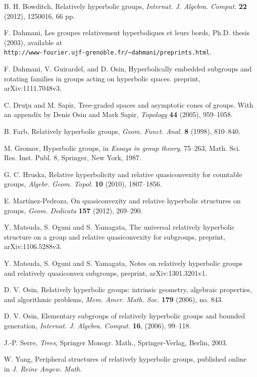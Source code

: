 \documentclass{amsart}
\theoremstyle{definition}
\begin{document}
\begin{thebibliography}{100}

B. H. Bowditch, 
Relatively hyperbolic groups, 
{\it Internat. J. Algebra. Comput.} {\bf 22} (2012), 1250016, 66 pp. 

F. Dahmani, Les groupes relativement hyperboliques et leurs bords, Ph.D. thesis (2003), available at \\
{\tt http://www-fourier.ujf-grenoble.fr/\verb+~+dahmani/preprints.html}. 

F. Dahmani, V. Guirardel, and D. Osin, 
Hyperbolically embedded subgroups and rotating families in groups acting on hyperbolic spaces. 
preprint, arXiv:1111.7048v3. 

C. Dru\c{t}u and M. Sapir, Tree-graded spaces and asymptotic cones of groups. With an appendix by Denis Osin and Mark Sapir, {\it Topology} {\bf 44} (2005), 959--1058.

B. Farb, 
Relatively hyperbolic groups,
{\it Geom. Funct. Anal.} {\bf 8} (1998), 810--840. 

M. Gromov, 
Hyperbolic groups, 
in {\it Essays in group theory}, 75--263, Math. Sci. Res. Inst. Publ. 8, 
Springer, New York, 1987.

G. C. Hruska,
Relative hyperbolicity and relative quasiconvexity for countable groups, 
{\it Algebr. Geom. Topol.} {\bf 10} (2010), 1807--1856. 

E. Mart\'inez-Pedroza,
On quasiconvexity and relative hyperbolic structures on groups,
{\it Geom. Dedicata} {\bf 157} (2012), 269--290.

Y. Matsuda, S. Oguni and S. Yamagata, The universal relatively hyperbolic structure on a group and relative quasiconvexity for subgroups, preprint, arXiv:1106.5288v3.

Y. Matsuda, S. Oguni and S. Yamagata, 
Notes on relatively hyperbolic groups and relatively quasiconvex subgroups, preprint, arXiv:1301.3201v1. 

D. V. Osin, 
Relatively hyperbolic groups: intrinsic geometry, algebraic properties, and algorithmic problems, 
{\it Mem. Amer. Math. Soc.} {\bf 179} (2006), no. 843.   

D. V. Osin, 
Elementary subgroups of relatively hyperbolic groups and bounded generation, 
{\it Internat. J. Algebra. Comput.} {\bf 16}, (2006), 99--118.

J.-P. Serre, 
{\it Trees},
Springer Monogr. Math., Springer-Verlag, Berlin, 2003.

W. Yang, Peripheral structures of relatively hyperbolic groups, published online in {\it J. Reine Angew. Math.}  

\end{thebibliography}
\end{document}

